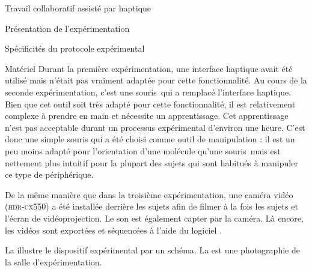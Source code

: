 \documentclass[myfrancais]{mythesis}
\begin{document}
\begin{mychapter}{Travail collaboratif assisté par haptique}
\begin{mysection}{Présentation de l'expérimentation}
\begin{mysubsection}{Spécificités du protocole expérimental}
\begin{mysubsubsection}{Matériel}
					Durant la première expérimentation, une interface haptique avait été utilisé mais n'était pas vraiment adaptée pour cette fonctionnalité.
					Au cours de la seconde expérimentation, c'est une souris~\myThreeD qui a remplacé l'interface haptique.
					Bien que cet outil soit très adapté pour cette fonctionnalité, il est relativement complexe à prendre en main et nécessite un apprentissage.
					Cet apprentissage n'est pas acceptable durant un processus expérimental d'environ une heure.
					C'est donc une simple souris \myUSB qui a été choisi comme outil de manipulation : il est un peu moins adapté pour l'orientation d'une molécule qu'une souris~\myThreeD mais est nettement plus intuitif pour la plupart des sujets qui sont habitués à manipuler ce type de périphérique.

					De la même manière que dans la troisième expérimentation, une caméra vidéo \mySony (\textsc{hdr-cx550}) a été installée derrière les sujets afin de filmer à la fois les sujets et l'écran de vidéoprojection.
					Le son est également capter par la caméra.
					Là encore, les vidéos sont exportées et séquencées \myafortiori à l'aide du logiciel \myiMovie.

					La  illustre le dispositif expérimental par un schéma.
					La  est une photographie de la salle d'expérimentation.


\end{mysubsubsection}
\end{mysubsection}
\end{mysection}
\end{mychapter}
\end{document}
